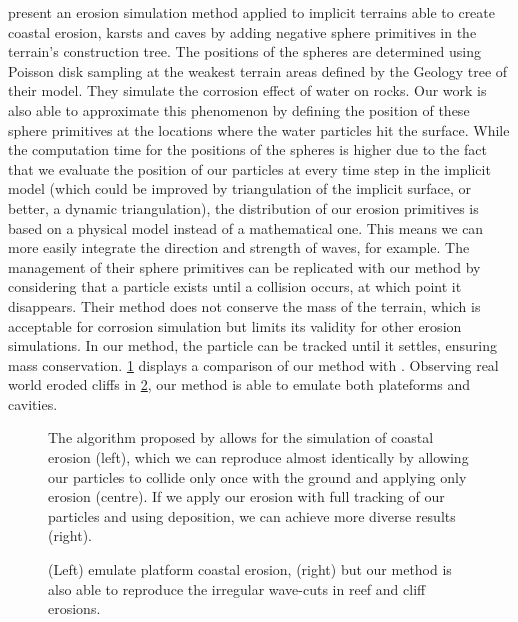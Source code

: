 \cite{Paris2019a} present an erosion simulation method applied to implicit terrains able to create coastal erosion, karsts and caves by adding negative sphere primitives in the terrain's construction tree. The positions of the spheres are determined using Poisson disk sampling at the weakest terrain areas defined by the Geology tree of their model. They simulate the corrosion effect of water on rocks. Our work is also able to approximate this phenomenon by defining the position of these sphere primitives at the locations where the water particles hit the surface. While the computation time for the positions of the spheres is higher due to the fact that we evaluate the position of our particles at every time step in the implicit model (which could be improved by triangulation of the implicit surface, or better, a dynamic triangulation), the distribution of our erosion primitives is based on a physical model instead of a mathematical one. This means we can more easily integrate the direction and strength of waves, for example. The management of their sphere primitives can be replicated with our method by considering that a particle exists until a collision occurs, at which point it disappears. Their method does not conserve the mass of the terrain, which is acceptable for corrosion simulation but limits its validity for other erosion simulations. In our method, the particle can be tracked until it settles, ensuring mass conservation. \cref{fig:erosion-screen-paris2019-1} displays a comparison of our method with \cite{Paris2019a}. Observing real world eroded cliffs in \cref{fig:erosion-real-world-coastal}, our method is able to emulate both plateforms and cavities. 

\begin{figure}[H]
    \caption[Comparison of coastal erosion with \cite{Paris2019a}]{The algorithm proposed by \cite{Paris2019a} allows for the simulation of coastal erosion (left), which we can reproduce almost identically by allowing our particles to collide only once with the ground and applying only erosion (centre). If we apply our erosion with full tracking of our particles and using deposition, we can achieve more diverse results (right).}
    \label{fig:erosion-screen-paris2019-1}
\end{figure}
\begin{figure}[H]
    \caption[Real world examples of coastal erosion]{(Left) \cite{Paris2019a} emulate platform coastal erosion, (right) but our method is also able to reproduce the irregular wave-cuts in reef and cliff erosions.}
    \label{fig:erosion-real-world-coastal}
\end{figure}

